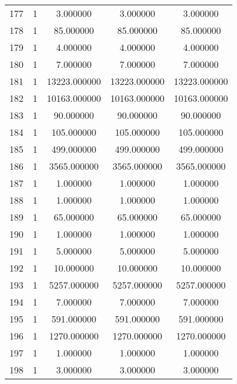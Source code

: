 \documentclass[a4paper,12pt]{article}
\begin{document}
\begin{center}
\begin{longtable}{l S[table-format=3.0] S[table-format=8.2] S[table-format=8.2] S[table-format=8.2]}
        177   &   1   &     3.000000   &      3.000000     &       3.000000 \\
        178   &   1   &    85.000000   &     85.000000     &      85.000000 \\
        179   &   1   &     4.000000   &      4.000000     &       4.000000 \\
        180   &   1   &     7.000000   &      7.000000     &       7.000000 \\
        181   &   1   & 13223.000000   &  13223.000000     &   13223.000000 \\
        182   &   1   & 10163.000000   &  10163.000000     &   10163.000000 \\
        183   &   1   &    90.000000   &     90.000000     &      90.000000 \\
        184   &   1   &   105.000000   &    105.000000     &     105.000000 \\
        185   &   1   &   499.000000   &    499.000000     &     499.000000 \\
        186   &   1   &  3565.000000   &   3565.000000     &    3565.000000 \\
        187   &   1   &     1.000000   &      1.000000     &       1.000000 \\
        188   &   1   &     1.000000   &      1.000000     &       1.000000 \\
        189   &   1   &    65.000000   &     65.000000     &      65.000000 \\
        190   &   1   &     1.000000   &      1.000000     &       1.000000 \\
        191   &   1   &     5.000000   &      5.000000     &       5.000000 \\
        192   &   1   &    10.000000   &     10.000000     &      10.000000 \\
        193   &   1   &  5257.000000   &   5257.000000     &    5257.000000 \\
        194   &   1   &     7.000000   &      7.000000     &       7.000000 \\
        195   &   1   &   591.000000   &    591.000000     &     591.000000 \\
         196   &   1   &  1270.000000   &   1270.000000     &    1270.000000 \\
        197   &   1   &     1.000000   &      1.000000     &       1.000000 \\
        198   &   1   &     3.000000   &      3.000000     &       3.000000 \\

\end{longtable}
\end{center}
\end{document}
